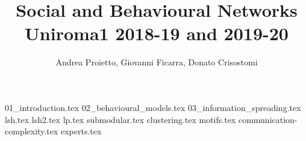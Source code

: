\documentclass{report}
\title{
    Social and Behavioural Networks \\
    \large Uniroma1 2018-19 and 2019-20
}
\author{Andrea Proietto, Giovanni Ficarra, Donato Crisostomi}
\begin{document}
\maketitle
\tableofcontents

{01_introduction.tex}
{02_behavioural_models.tex}
{03_information_spreading.tex}
{lsh.tex}
{lsh2.tex}
{lp.tex}
{submodular.tex}
{clustering.tex}
{motifs.tex}
{communication-complexity.tex}
{experts.tex}


\end{document}
